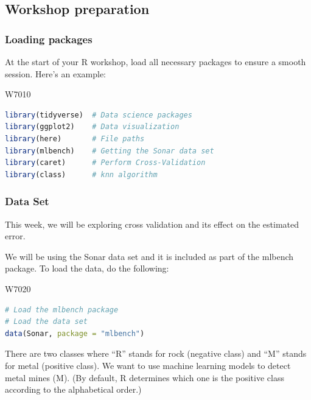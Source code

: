 \subsection{Workshop preparation}

\subsubsection{Loading packages}

\indent 

At the start of your R workshop, load all necessary packages to ensure a smooth session. Here’s an example:


\begin{ocg}{}{W701}{0}
\begin{lstlisting}[language=R]
library(tidyverse)  # Data science packages
library(ggplot2)    # Data visualization
library(here)       # File paths
library(mlbench)    # Getting the Sonar data set
library(caret)      # Perform Cross-Validation
library(class)      # knn algorithm
\end{lstlisting}
\end{ocg}

\subsubsection{Data Set}

\indent 

This week, we will be exploring cross validation and its effect on the estimated error.

We will be using the Sonar data set and it is included as part of the mlbench package. To load the data, do the following:


\begin{ocg}{}{W702}{0}
\begin{lstlisting}[language=R]
# Load the mlbench package
# Load the data set
data(Sonar, package = "mlbench")
\end{lstlisting}
\end{ocg}

There are two classes where “R” stands for rock (negative class) and “M” stands for metal (positive class). We want to use machine learning models to detect metal mines (M). (By default, R determines which one is the positive class according to the alphabetical order.)

